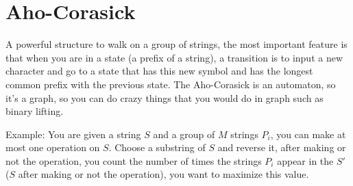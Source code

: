 \section{Aho-Corasick} 
A powerful structure to walk on a group of strings, the most important feature is that when you are in a state (a prefix of a string), a transition is to input a new character and go to a state that has this new symbol and has the longest common prefix with the previous state. The Aho-Corasick is an automaton, so it's a graph, so you can do crazy things that you would do in graph such as binary lifting.

Example: You are given a string $S$ and a group of $M$ strings $P_i$, you can make at most one operation on $S$. Choose a substring of $S$ and reverse it, after making or not the operation, you count the number of times the strings $P_i$ appear in the $S'$ ($S$ after making or not the operation), you want to maximize this value.

